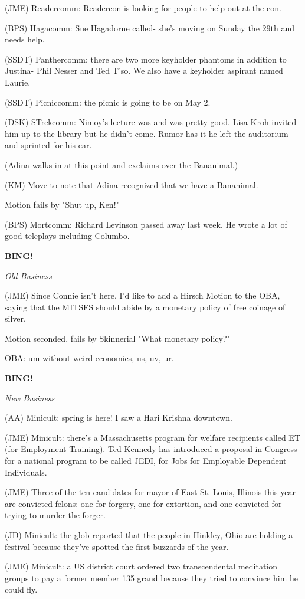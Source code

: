 \documentclass[12pt]{article}
\newcommand{\bing}{{\bf BING!} }
\newcommand{\goto}[1]{\bing \vskip 12pt \centerline{{\em{#1}}}}
\begin{document}
(JME) Readercomm: Readercon is looking for people to help out at the con.

(BPS) Hagacomm: Sue Hagadorne called- she's moving on Sunday the 29th and needs help.

(SSDT) Panthercomm: there are two more keyholder phantoms in addition to Justina- Phil Nesser and Ted T'so. We also have a keyholder aspirant named Laurie.

(SSDT) Picniccomm: the picnic is going to be on May 2.

(DSK) STrekcomm: Nimoy's lecture was and was pretty good. Lisa Kroh invited him up to the library but he didn't come. Rumor has it he left the auditorium and sprinted for his car.

(Adina walks in at this point and exclaims over the Bananimal.)

(KM) Move to note that Adina recognized that we have a Bananimal.

Motion fails by "Shut up, Ken!"

(BPS) Mortcomm: Richard Levinson passed away last week. He wrote a lot of good teleplays including Columbo.

\goto{Old Business}

(JME) Since Connie isn't here, I'd like to add a Hirsch Motion to the OBA, saying that the MITSFS should abide by a monetary policy of free coinage of silver.

Motion seconded, fails by Skinnerial "What monetary policy?"

OBA: um without weird economics, us, uv, ur.

\goto{New Business}

(AA) Minicult: spring is here! I saw a Hari Krishna downtown.

(JME) Minicult: there's a Massachusetts program for welfare recipients called ET (for Employment Training). Ted Kennedy has introduced a proposal in Congress for a national program to be called JEDI, for Jobs for Employable Dependent Individuals.

(JME) Three of the ten candidates for mayor of East St. Louis, Illinois this year are convicted felons: one for forgery, one for extortion, and one convicted for trying to murder the forger.

(JD) Minicult: the glob reported that the people in Hinkley, Ohio are holding a festival because they've spotted the first buzzards of the year.

(JME) Minicult: a US district court ordered two transcendental meditation groups to pay a former member 135 grand because they tried to convince him he could fly.
\end{document}
